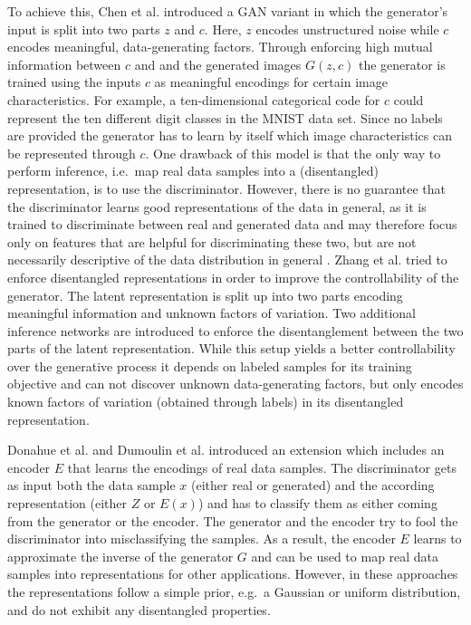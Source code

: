 \documentclass{esannV2}
\begin{document}
To achieve this, Chen et al. \cite{Chen2016} introduced a GAN variant in which the generator's input is split into two parts $z$ and $c$. Here, $z$ encodes unstructured noise while $c$ encodes meaningful, data-generating factors. Through enforcing high mutual information between $c$ and and the generated images $G(z, c)$ the generator is trained using the inputs $c$ as meaningful encodings for certain image characteristics. For example, a ten-dimensional categorical code for $c$ could represent the ten different digit classes in the MNIST data set. Since no labels are provided the generator has to learn by itself which image characteristics can be represented through $c$.
One drawback of this model is that the only way to perform inference, i.e.\ map real data samples into a (disentangled) representation, is to use the discriminator. However, there is no guarantee that the discriminator learns good representations of the data in general, as it is trained to discriminate between real and generated data and may therefore focus only on features that are helpful for discriminating these two, but are not necessarily descriptive of the data distribution in general \cite{Donahue2017}.
Zhang et al. \cite{Zhang2017} tried to enforce disentangled representations in order to improve the controllability of the generator. The latent representation is split up into two parts encoding meaningful information and unknown factors of variation. Two additional inference networks are introduced to enforce the disentanglement between the two parts of the latent representation. While this setup yields a better controllability over the generative process it depends on labeled samples for its training objective and can not discover unknown data-generating factors, but only encodes known factors of variation (obtained through labels) in its disentangled representation.

Donahue et al. \cite{Donahue2017} and Dumoulin et al. \cite{Dumoulin2017} introduced an extension which includes an encoder $E$ that learns the encodings of real data samples. The discriminator gets as input both the data sample $x$ (either real or generated) and the according representation (either $Z$ or $E(x)$) and has to classify them as either coming from the generator or the encoder. The generator and the encoder try to fool the discriminator into misclassifying the samples. As a result, the encoder $E$ learns to approximate the inverse of the generator $G$ and can be used to map real data samples into representations for other applications. However, in these approaches the representations follow a simple prior, e.g.\ a Gaussian or uniform distribution, and do not exhibit any disentangled properties.
\end{document}
